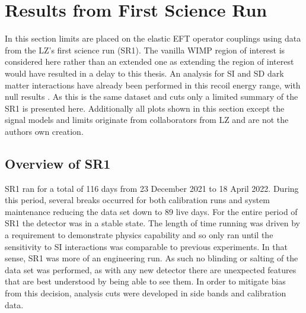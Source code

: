 \section{Results from First Science Run}
\par
In this section limits are placed on the elastic EFT operator couplings using data from the LZ's first science run (SR1).
The vanilla WIMP region of interest is considered here rather than an extended one as extending the region of interest would have resulted in a delay to this thesis.
An analysis for SI and SD dark matter interactions have already been performed in this recoil energy range, with null results \cite{lz_ws_sr1_ref}.
As this is the same dataset and cuts only a limited summary of the SR1 is presented here.
Additionally all plots shown in this section except the signal models and limits originate from collaborators from LZ and are not the authors own creation.

\subsection{Overview of SR1}
\par
SR1 ran for a total of 116 days from 23 December 2021 to 18 April 2022.
During this period, several breaks occurred for both calibration runs and system maintenance reducing the data set down to 89 live days.
For the entire period of SR1 the detector was in a stable state.
The length of time running was driven by a requirement to demonstrate physics capability and so only ran until the sensitivity to SI interactions was comparable to previous experiments.
In that sense, SR1 was more of an engineering run.
As such no blinding or salting of the data set was performed, as with any new detector there are unexpected features that are best understood by being able to see them.
In order to mitigate bias from this decision, analysis cuts were developed in side bands and calibration data.


